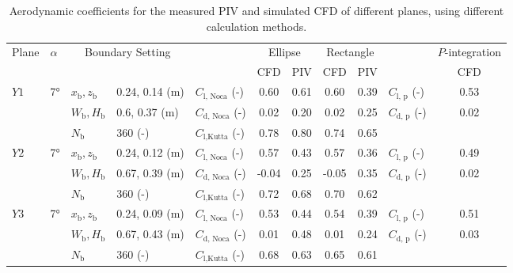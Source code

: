 \documentclass[wes, manuscript]{copernicus}
\begin{document}
\begin{table}[htp]
    \centering
    \caption{Aerodynamic coefficients for the measured PIV and simulated CFD of different planes, using different calculation methods.}
    \begin{tabular}{p{0.5cm} p{0.8cm} p{.8cm} p{2.6cm} p{1.8cm} c c c p{1cm} p{1.3cm} c} %
    \hline
    \multirow{2}{*}{Plane} & \multirow{2}{*}{$\alpha$} & \multicolumn{2}{c}{\multirow{2}{*}{Boundary Setting}} & \multirow{2}{*}{} & \multicolumn{2}{c}{Ellipse} & \multicolumn{2}{c}{Rectangle} &  & $P$-integration \\
    & & & & & CFD & PIV & CFD & PIV & & CFD \\
    \hline
    \multirow{3}{*}{$Y1$} & \multirow{3}{*}{7\unit{\degree}}
    & $x_{\textrm{b}},z_{\textrm{b}}$ & 0.24, 0.14 (\unit{m}) & $C_{\textrm{l, Noca}}$ (\unit{-}) & 0.60 & 0.61 & 0.60 & 0.39 & $C_{\textrm{l, p}}$ (\unit{-})& 0.53 \\
    & & $W_{\textrm{b}}, H_{\textrm{b}}$ & 0.6, 0.37 (\unit{m}) & $C_{\textrm{d, Noca}}$ (\unit{-})& 0.02 & 0.20 & 0.02 & 0.25 & $C_{\textrm{d, p}}$ (\unit{-})& 0.02 \\
    & & $N_{\textrm{b}}$ & 360 (\unit{-}) & $C_{\textrm{l,Kutta}}$ (\unit{-})& 0.78 & 0.80 & 0.74 & 0.65 & & \\
    \hline
    \multirow{3}{*}{$Y2$} & \multirow{3}{*}{7\unit{\degree}}
    & $x_{\textrm{b}},z_{\textrm{b}}$ & 0.24, 0.12 (\unit{m}) & $C_{\textrm{l, Noca}}$ (\unit{-})& 0.57 & 0.43 & 0.57 & 0.36 & $C_{\textrm{l, p}}$ (\unit{-})& 0.49 \\
    & & $W_{\textrm{b}}, H_{\textrm{b}}$ & 0.67, 0.39 (\unit{m}) & $C_{\textrm{d, Noca}}$ (\unit{-})& -0.04 & 0.25 & -0.05 & 0.35 & $C_{\textrm{d, p}}$ (\unit{-})& 0.02 \\
    & & $N_{\textrm{b}}$ & 360 (\unit{-}) & $C_{\textrm{l,Kutta}}$ (\unit{-})& 0.72 & 0.68 & 0.70 & 0.62 & & \\
    \hline
    \multirow{3}{*}{$Y3$} & \multirow{3}{*}{7\unit{\degree}}
    & $x_{\textrm{b}},z_{\textrm{b}}$ & 0.24, 0.09 (\unit{m}) & $C_{\textrm{l, Noca}}$ (\unit{-})& 0.53 & 0.44 & 0.54 & 0.39 & $C_{\textrm{l, p}}$ (\unit{-})& 0.51 \\
    & & $W_{\textrm{b}}, H_{\textrm{b}}$ & 0.67, 0.43 (\unit{m}) & $C_{\textrm{d, Noca}}$ (\unit{-})& 0.01 & 0.48 & 0.01 & 0.24 & $C_{\textrm{d, p}}$ (\unit{-})& 0.03 \\
    & & $N_{\textrm{b}}$ & 360 (\unit{-}) & $C_{\textrm{l,Kutta}}$ (\unit{-})& 0.68 & 0.63 & 0.65 & 0.61 & & \\

\end{tabular}
\end{table}
\end{document}
